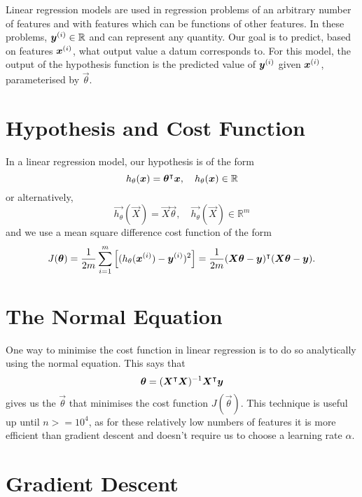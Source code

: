 Linear regression models are used in regression problems of an arbitrary number of features and with features which can be functions of other features.
In these problems, $\bm{y}^{(i)} \in \mathbb{R}$ and can represent any quantity. Our goal is to predict, based on features $\bm{x}^{(i)}$, what output value
a datum corresponds to. For this model, the output of the hypothesis function is the predicted value of $\bm{y}^{(i)}$ given $\bm{x}^{(i)}$, parameterised by
$\vec{\theta}$.

\section{Hypothesis and Cost Function}

In a linear regression model, our hypothesis is of the form
\begin{equation}
    h_{\theta}(\bm{x}) = \bm{\theta}^{\intercal}\bm{x},\quad h_{\theta}(\bm{x}) \in \mathbb{R}
\end{equation}
or alternatively,
\begin{equation}
    \vec{h_{\theta}}(\vec{X}) = \vec{X}\vec{\theta},\quad \vec{h_{\theta}}(\vec{X}) \in \mathbb{R}^m
\end{equation}
and we use a mean square difference cost function of the form
\begin{equation}
    J(\bm{\theta}) = \frac{1}{2m} \sum_{i = 1}^{m} \left[ (h_{\theta}(\bm{x}^{(i)}) - \bm{y}^{(i)})^2 \right] = \frac{1}{2m}(\bm{X}\bm{\theta} - \bm{y})^{\intercal}(\bm{X}\bm{\theta} - \bm{y}).
\end{equation}

\section{The Normal Equation}

One way to minimise the cost function in linear regression is to do so analytically using the normal equation. This says that
\begin{equation}
    \bm{\theta} = (\bm{X}^{\intercal}\bm{X})^{-1}\bm{X}^{\intercal}\bm{y}
\end{equation}
gives us the $\vec{\theta}$ that minimises the cost function $J(\vec{\theta})$. This technique is useful up until $n >= 10^{4}$, as for these relatively low numbers of features
it is more efficient than gradient descent and doesn't require us to choose a learning rate $\alpha$.

\section{Gradient Descent}


